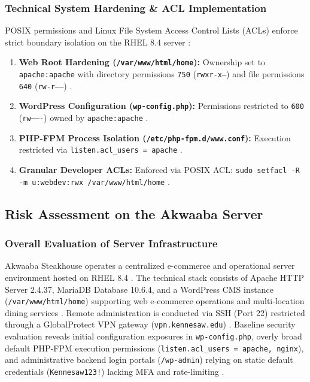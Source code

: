 \documentclass[10pt,a4paper]{article}
\begin{document}
\subsubsection{Technical System Hardening \& ACL Implementation}
POSIX permissions and Linux File System Access Control Lists (ACLs) enforce strict boundary isolation on the RHEL 8.4 server \cite{AkwaabaConfig, LiISP}:
\begin{enumerate}[leftmargin=*]
    \item \textbf{Web Root Hardening (\texttt{/var/www/html/home}):} Ownership set to \texttt{apache:apache} with directory permissions \texttt{750} (\texttt{rwxr-x---}) and file permissions \texttt{640} (\texttt{rw-r-----}) \cite{AkwaabaConfig, LiISP}.
    \item \textbf{WordPress Configuration (\texttt{wp-config.php}):} Permissions restricted to \texttt{600} (\texttt{rw-------}) owned by \texttt{apache:apache} \cite{AkwaabaConfig, LiISP}.
    \item \textbf{PHP-FPM Process Isolation (\texttt{/etc/php-fpm.d/www.conf}):} Execution restricted via \texttt{listen.acl\_users = apache} \cite{AkwaabaConfig}.
    \item \textbf{Granular Developer ACLs:} Enforced via POSIX ACL: \texttt{sudo setfacl -R -m u:webdev:rwx /var/www/html/home} \cite{LiISP}.
\end{enumerate}

\subsection{Risk Assessment on the Akwaaba Server}

\subsubsection{Overall Evaluation of Server Infrastructure}
Akwaaba Steakhouse operates a centralized e-commerce and operational server environment hosted on RHEL 8.4 \cite{AkwaabaConfig}. The technical stack consists of Apache HTTP Server 2.4.37, MariaDB Database 10.6.4, and a WordPress CMS instance (\texttt{/var/www/html/home}) supporting web e-commerce operations and multi-location dining services \cite{AkwaabaConfig}. Remote administration is conducted via SSH (Port 22) restricted through a GlobalProtect VPN gateway (\texttt{vpn.kennesaw.edu}) \cite{VMConnect}. Baseline security evaluation reveals initial configuration exposures in \texttt{wp-config.php}, overly broad default PHP-FPM execution permissions (\texttt{listen.acl\_users = apache, nginx}), and administrative backend login portals (\texttt{/wp-admin}) relying on static default credentials (\texttt{Kennesaw123!}) lacking MFA and rate-limiting \cite{AkwaabaConfig, RiskSlides}.
\end{document}
